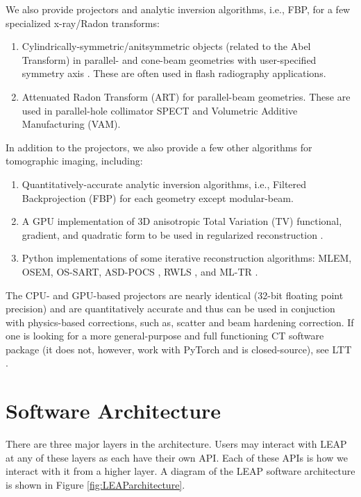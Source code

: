 \documentclass[11pt]{article}
\begin{document}
We also provide projectors and analytic inversion algorithms, i.e., FBP, for a few specialized x-ray/Radon transforms:
\begin{enumerate}
\item Cylindrically-symmetric/anitsymmetric objects (related to the Abel Transform) in parallel- and cone-beam geometries with user-specified symmetry axis \cite{ChampleyMaddox_Optica_2021}. These are often used in flash radiography applications.
\item Attenuated Radon Transform (ART) for parallel-beam geometries. These are used in parallel-hole collimator SPECT and Volumetric Additive Manufacturing (VAM).
\end{enumerate}

In addition to the projectors, we also provide a few other algorithms for tomographic imaging, including:
\begin{enumerate}
\item Quantitatively-accurate analytic inversion algorithms, i.e., Filtered Backprojection (FBP) for each geometry except modular-beam.
\item A GPU implementation of 3D anisotropic Total Variation (TV) functional, gradient, and quadratic form to be used in regularized reconstruction \cite{Yu_MIC_2006}.
\item Python implementations of some iterative reconstruction algorithms: MLEM, OSEM, OS-SART, ASD-POCS \cite{ASDPOCS_PMB_2008}, RWLS \cite{Hager_Zhang_CG_2005, Fessler_TIP_1999, Yu_MIC_2006}, and ML-TR \cite{IMPACT_TMI_2001}.
\end{enumerate}

The CPU- and GPU-based projectors are nearly identical (32-bit floating point precision) and are quantitatively accurate and thus can be used in conjuction with physics-based corrections, such as, scatter and beam hardening correction. If one is looking for a more general-purpose and full functioning CT software package (it does not, however, work with PyTorch and is closed-source), see LTT \cite{ChampleyLTT}.

\section{Software Architecture}

There are three major layers in the architecture.  Users may interact with LEAP at any of these layers as each have their own API.  Each of these APIs is how we interact with it from a higher layer.  A diagram of the LEAP software architecture is shown in Figure \ref{fig:LEAParchitecture}.
\end{document}
